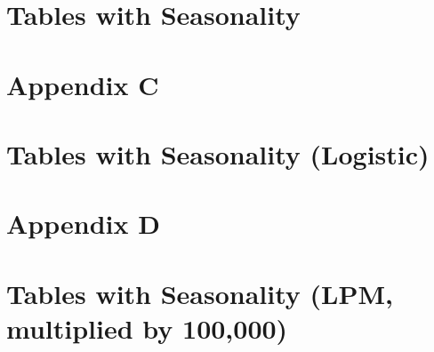 \section*{Tables with Seasonality}

\vfill
\eject














\clearpage
\pagebreak

\section*{Appendix C}
\vspace{3.0in}

\section*{Tables with Seasonality (Logistic)}

\vfill
\eject












\clearpage
\pagebreak

\section*{Appendix D}
\vspace{3.0in}

\section*{Tables with Seasonality (LPM, multiplied by 100,000)}

\vfill
\eject





